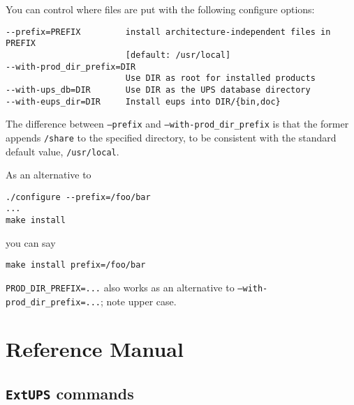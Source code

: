 \documentclass{article}
\newcommand{\code}[1]{\texttt{#1}}
\newcommand{\eups}{\code{ExtUPS}}
\begin{document}
You can control where files are put with the following configure options:
\begin{verbatim}
--prefix=PREFIX         install architecture-independent files in PREFIX
                        [default: /usr/local]
--with-prod_dir_prefix=DIR
                        Use DIR as root for installed products
--with-ups_db=DIR       Use DIR as the UPS database directory
--with-eups_dir=DIR     Install eups into DIR/{bin,doc}
\end{verbatim}
The difference between \texttt{--prefix} and \texttt{--with-prod\_dir\_prefix}
is that the former appends \texttt{/share} to the specified directory, to
be consistent with the standard default value, \texttt{/usr/local}.
  
As an alternative to
\begin{verbatim}
./configure --prefix=/foo/bar
...
make install
\end{verbatim}
you can say
\begin{verbatim}
make install prefix=/foo/bar
\end{verbatim}
\texttt{PROD\_DIR\_PREFIX=...} also works as an alternative to \texttt{--with-prod\_dir\_prefix=...};
note upper case.
  
\section{Reference Manual}

\subsection{\eups{} commands}
\end{document}
